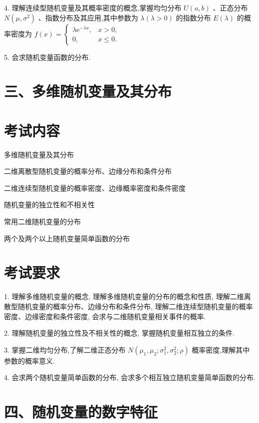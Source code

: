 \documentclass[10pt]{article}
\begin{document}
4. 理解连续型随机变量及其概率密度的概念,掌握均匀分布 \(U\left( {a,b}\right)\) 、正态分布 \(N\left( {\mu ,{\sigma }^{2}}\right)\) 、指数分布及其应用,其中参数为 \(\lambda \left( {\lambda  > 0}\right)\) 的指数分布 \(E\left( \lambda \right)\) 的概率密度为 \(f\left( x\right)  = \left\{  \begin{array}{ll} \lambda {\mathrm{e}}^{-{\lambda x}}, & x > 0, \\  0, & x \leq  0. \end{array}\right.\)

5. 会求随机变量函数的分布.

\section*{三、多维随机变量及其分布}

\section*{考试内容}

多维随机变量及其分布 

二维离散型随机变量的概率分布、边缘分布和条件分布 

二维连续型随机变量的概率密度、边缘概率密度和条件密度 

随机变量的独立性和不相关性 

常用二维随机变量的分布 

两个及两个以上随机变量简单函数的分布

\section*{考试要求}

1. 理解多维随机变量的概念, 理解多维随机变量的分布的概念和性质, 理解二维离散型随机变量的概率分布、边缘分布和条件分布, 理解二维连续型随机变量的概率密度、边缘密度和条件密度, 会求与二维随机变量相关事件的概率.

2. 理解随机变量的独立性及不相关性的概念, 掌握随机变量相互独立的条件.

3. 掌握二维均匀分布,了解二维正态分布 \(N\left( {{\mu }_{1},{\mu }_{2};{\sigma }_{1}^{2},{\sigma }_{2}^{2};\rho }\right)\) 概率密度,理解其中参数的概率意义.

4. 会求两个随机变量简单函数的分布, 会求多个相互独立随机变量简单函数的分布.

\section*{四、随机变量的数字特征}
\end{document}

